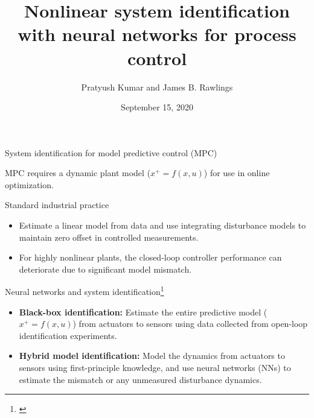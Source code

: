 \documentclass[xcolor=dvipsnames, 8pt]{beamer} %
\title[Nonlinear system identification with neural networks for 
process control]{Nonlinear system identification with neural networks for 
process control}
\date{September 15, 2020}
\author[Kumar and Rawlings]{\large Pratyush Kumar and James B. Rawlings}
\institute[UCSB]{
	\begin{minipage}{4in}
		\vspace{-10pt}
		\centering
		\raisebox{-0.1\height}{\texttt{[image: UCSB\_seal]}}
	\end{minipage}
	\vspace{10pt}
	\newline
	{\large Department of Chemical Engineering}
	\vspace{10pt}
	\newline
	{\large TWCCC Meeting (Virtual)}}
\begin{document}
\frame{\titlepage}

\begin{frame}{System identification for model predictive control (MPC)}

MPC requires a dynamic plant model ($x^+ = f(x, u)$) for use in online optimization.  

	\begin{block}{Standard industrial practice}
		\begin{itemize}
			\item Estimate a linear model from data and use integrating disturbance models to maintain zero offset 
			in controlled measurements.
			\item For highly nonlinear plants, the closed-loop controller performance can deteriorate due to significant model mismatch. 
		\end{itemize}
	\end{block}
	
	\begin{block}{Neural networks and system identification\footnote[frame]{\cite{hussain:1999, draeger:engell:ranke:1995, lovelett:avalos:kevrekidis:2019, tuor:drgona:vrabie:2020}}}
		\begin{itemize}
			\item \textbf{Black-box identification:} Estimate the entire predictive model ($x^+ =  f(x, u)$) from actuators to
			sensors using data collected from open-loop identification experiments.
			\item \textbf{Hybrid model identification:} Model the dynamics from actuators to sensors using first-principle knowledge, and use
			neural networks (NNs) to estimate the mismatch or any unmeasured disturbance dynamics.  
		\end{itemize}
	\end{block}
\end{frame}
\end{document}
